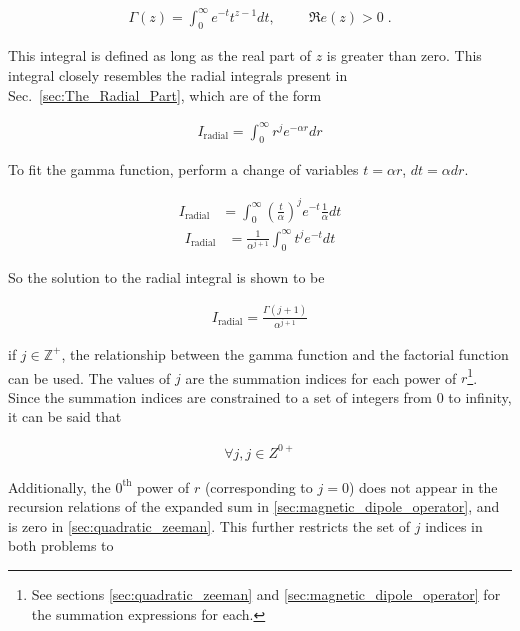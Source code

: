         \begin{align}
            \Gamma(z) = \int_0^\infty e^{-t} t^{z-1} dt, \hspace{1cm} \mathfrak{R}e(z) > 0\;.
        \end{align}

        \noindent This integral is defined as long as the real part of $z$ is greater than zero. This integral closely resembles the radial integrals present in Sec.~\ref{sec:The_Radial_Part}, which are of the form

        \begin{align}
            I_{\text{radial}} = \int_0^\infty r^j e^{-\alpha r} dr
        \end{align}

        \noindent To fit the gamma function, perform a change of variables $t = \alpha r$, $dt = \alpha dr$.

        \begin{align}
            I_{\text{radial}} &= \int_0^\infty \left( \frac{t}{\alpha} \right)^j e^{-t} \frac{1}{\alpha} dt
        \end{align}
        \begin{align}
            I_{\text{radial}} &= \frac{1}{\alpha^{j+1}}\int_0^\infty {t}^j e^{-t} dt
        \end{align}

        \noindent So the solution to the radial integral is shown to be 

        \begin{align}
            I_{\text{radial}} = \frac{\Gamma(j+1)}{\alpha^{j+1}}
        \end{align}

        \noindent if $j \in \mathbb{Z}^+$, the relationship between the gamma function and the factorial function can be used. The values of $j$ are the summation indices for each power of $r$\footnote{See sections \ref{sec:quadratic_zeeman} and \ref{sec:magnetic_dipole_operator} for the summation expressions for each.}. Since the summation indices are constrained to a set of integers from 0 to infinity, it can be said that 

        \begin{align}
            \forall j, j \in Z^{0+}
        \end{align}

        \noindent Additionally, the $0^{\text{th}}$ power of $r$ (corresponding to $j = 0$) does not appear in the recursion relations of the expanded sum in \ref{sec:magnetic_dipole_operator}, and is zero in \ref{sec:quadratic_zeeman}. This further restricts the set of $j$ indices in both problems to 


